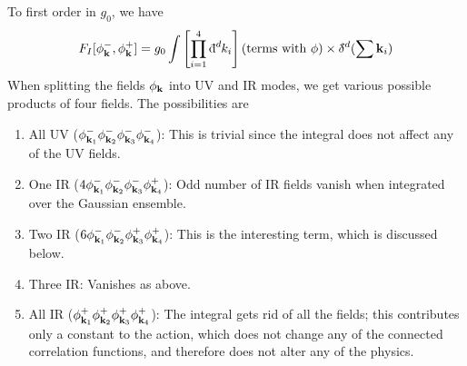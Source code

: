 To first order in $g_0$, we have
\begin{equation}
  F_I[\phi^-_{\vb{k}}, \phi^+_{\vb{k}}] = g_0 \int \left[ \prod_{i=1}^4 \bdd[d]{k_i} \right] (\text{terms with $\phi$}) \times \bdelta^d (\sum \vb{k}_i)
\end{equation}
When splitting the fields $\phi_{\vb{k}}$ into UV and IR modes, we get various possible products of four fields.
The possibilities are
\begin{enumerate}
  \item All UV ($\phi^-_{\vb{k}_1}\phi^-_{\vb{k}_2}\phi^-_{\vb{k}_3}\phi^-_{\vb{k}_4}$): This is trivial since the integral does not affect any of the UV fields.
  \item One IR ($4 \phi^-_{\vb{k}_1} \phi^-_{\vb{k}_2}\phi^-_{\vb{k}_3}\phi^+_{\vb{k}_4}$): Odd number of IR fields vanish when integrated over the Gaussian ensemble.
  \item Two IR ($6\phi^-_{\vb{k}_1} \phi^-_{\vb{k}_2}\phi^+_{\vb{k}_3}\phi^+_{\vb{k}_4}$): This is the interesting term, which is discussed below.
  \item Three IR: Vanishes as above.
  \item All IR ($\phi^+_{\vb{k}_1}\phi^+_{\vb{k}_2}\phi^+_{\vb{k}_3}\phi^+_{\vb{k}_4}$): The integral gets rid of all the fields; this contributes only a constant to the action, which does not change any of the connected correlation functions, and therefore does not alter any of the physics.
\end{enumerate}

